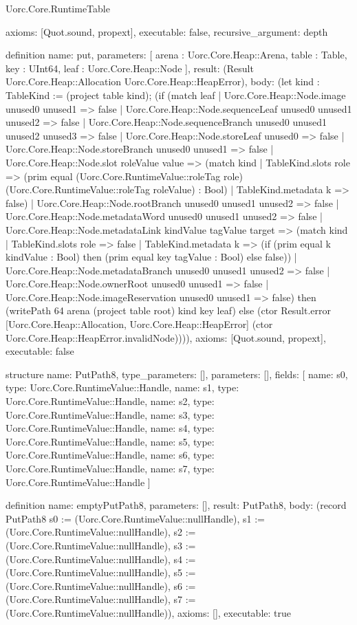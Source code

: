 \begin{lexlean}{Uorc.Core.RuntimeTable}
\begin{semanticmodule}
{  axioms: [Quot.sound, propext],
  executable: false,
  recursive_argument: depth
}

definition{
  name: put,
  parameters: [
    arena : Uorc.Core.Heap::Arena,
    table : Table,
    key : UInt64,
    leaf : Uorc.Core.Heap::Node
  ],
  result: (Result Uorc.Core.Heap::Allocation Uorc.Core.Heap::HeapError),
  body: (let kind : TableKind := (project table kind); (if (match leaf
    | Uorc.Core.Heap::Node.image unused0 unused1 => false
    | Uorc.Core.Heap::Node.sequenceLeaf unused0 unused1 unused2 => false
    | Uorc.Core.Heap::Node.sequenceBranch unused0 unused1 unused2 unused3 => false
    | Uorc.Core.Heap::Node.storeLeaf unused0 => false
    | Uorc.Core.Heap::Node.storeBranch unused0 unused1 => false
    | Uorc.Core.Heap::Node.slot roleValue value => (match kind
      | TableKind.slots role => (prim equal (Uorc.Core.RuntimeValue::roleTag role) (Uorc.Core.RuntimeValue::roleTag roleValue) : Bool)
      | TableKind.metadata k => false)
    | Uorc.Core.Heap::Node.rootBranch unused0 unused1 unused2 => false
    | Uorc.Core.Heap::Node.metadataWord unused0 unused1 unused2 => false
    | Uorc.Core.Heap::Node.metadataLink kindValue tagValue target => (match kind
      | TableKind.slots role => false
      | TableKind.metadata k => (if (prim equal k kindValue : Bool) then (prim equal key tagValue : Bool) else false))
    | Uorc.Core.Heap::Node.metadataBranch unused0 unused1 unused2 => false
    | Uorc.Core.Heap::Node.ownerRoot unused0 unused1 => false
    | Uorc.Core.Heap::Node.imageReservation unused0 unused1 => false) then (writePath 64 arena (project table root) kind key leaf) else (ctor Result.error [Uorc.Core.Heap::Allocation, Uorc.Core.Heap::HeapError] (ctor Uorc.Core.Heap::HeapError.invalidNode)))),
  axioms: [Quot.sound, propext],
  executable: false
}

structure{
  name: PutPath8,
  type_parameters: [],
  parameters: [],
  fields: [
    {name: s0, type: Uorc.Core.RuntimeValue::Handle},
    {name: s1, type: Uorc.Core.RuntimeValue::Handle},
    {name: s2, type: Uorc.Core.RuntimeValue::Handle},
    {name: s3, type: Uorc.Core.RuntimeValue::Handle},
    {name: s4, type: Uorc.Core.RuntimeValue::Handle},
    {name: s5, type: Uorc.Core.RuntimeValue::Handle},
    {name: s6, type: Uorc.Core.RuntimeValue::Handle},
    {name: s7, type: Uorc.Core.RuntimeValue::Handle}
  ]
}

definition{
  name: emptyPutPath8,
  parameters: [],
  result: PutPath8,
  body: (record PutPath8 {s0 := (Uorc.Core.RuntimeValue::nullHandle), s1 := (Uorc.Core.RuntimeValue::nullHandle), s2 := (Uorc.Core.RuntimeValue::nullHandle), s3 := (Uorc.Core.RuntimeValue::nullHandle), s4 := (Uorc.Core.RuntimeValue::nullHandle), s5 := (Uorc.Core.RuntimeValue::nullHandle), s6 := (Uorc.Core.RuntimeValue::nullHandle), s7 := (Uorc.Core.RuntimeValue::nullHandle)}),
  axioms: [],
  executable: true
}


\end{semanticmodule}
\end{lexlean}

